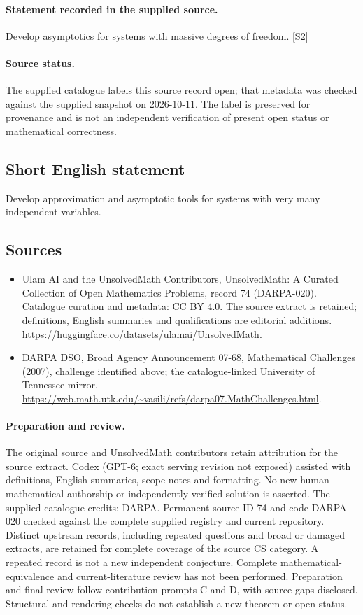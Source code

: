 \documentclass[11pt]{article}
\begin{document}
\paragraph{Statement recorded in the supplied source.}
Develop asymptotics for systems with massive degrees of freedom. \href{https://web.math.utk.edu/~vasili/refs/darpa07.MathChallenges.html}{[S2]}
\paragraph{Source status.}
The supplied catalogue labels this source record open; that metadata was checked against the supplied snapshot on 2026-10-11. The label is preserved for provenance and is not an independent verification of present open status or mathematical correctness.
\subsection{Short English statement}
Develop approximation and asymptotic tools for systems with very many independent variables.
\subsection{Sources}
\begin{itemize}
\item[S1] Ulam AI and the UnsolvedMath Contributors, UnsolvedMath: A Curated Collection of Open Mathematics Problems, record 74 (DARPA-020). Catalogue curation and metadata: CC BY 4.0. The source extract is retained; definitions, English summaries and qualifications are editorial additions.
\url{https://huggingface.co/datasets/ulamai/UnsolvedMath}.
\item[S2] DARPA DSO, Broad Agency Announcement 07-68, Mathematical Challenges (2007), challenge identified above; the catalogue-linked University of Tennessee mirror.
\url{https://web.math.utk.edu/~vasili/refs/darpa07.MathChallenges.html}.
\end{itemize}
\paragraph{Preparation and review.}
The original source and UnsolvedMath contributors retain attribution for the source extract. Codex (GPT-6; exact serving revision not exposed) assisted with definitions, English summaries, scope notes and formatting. No new human mathematical authorship or independently verified solution is asserted. The supplied catalogue credits: DARPA. Permanent source ID 74 and code DARPA-020 checked against the complete supplied registry and current repository. Distinct upstream records, including repeated questions and broad or damaged extracts, are retained for complete coverage of the source CS category. A repeated record is not a new independent conjecture. Complete mathematical-equivalence and current-literature review has not been performed. Preparation and final review follow contribution prompts C and D, with source gaps disclosed. Structural and rendering checks do not establish a new theorem or open status.
\label{end:74}
\end{document}

